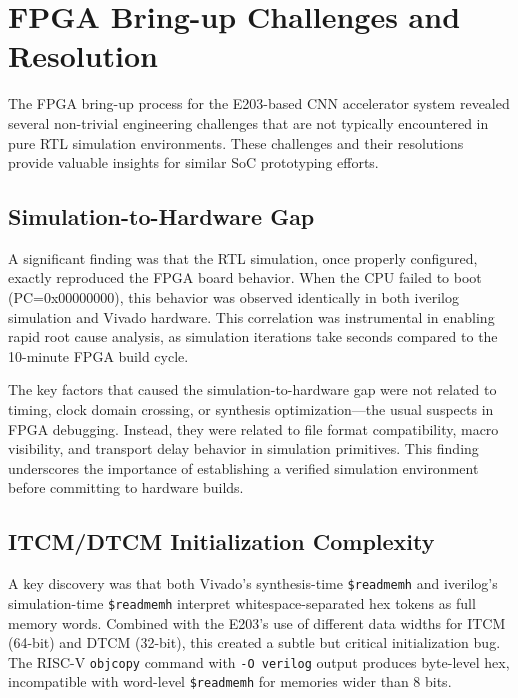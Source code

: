 

\section{FPGA Bring-up Challenges and Resolution}\label{sec:5_1}

The FPGA bring-up process for the E203-based CNN accelerator system revealed several non-trivial engineering challenges that are not typically encountered in pure RTL simulation environments. These challenges and their resolutions provide valuable insights for similar SoC prototyping efforts.


\subsection{Simulation-to-Hardware Gap}

A significant finding was that the RTL simulation, once properly configured, exactly reproduced the FPGA board behavior. When the CPU failed to boot (PC=0x00000000), this behavior was observed identically in both iverilog simulation and Vivado hardware. This correlation was instrumental in enabling rapid root cause analysis, as simulation iterations take seconds compared to the 10-minute FPGA build cycle.


The key factors that caused the simulation-to-hardware gap were not related to timing, clock domain crossing, or synthesis optimization---the usual suspects in FPGA debugging. Instead, they were related to file format compatibility, macro visibility, and transport delay behavior in simulation primitives. This finding underscores the importance of establishing a verified simulation environment before committing to hardware builds.


\subsection{ITCM/DTCM Initialization Complexity}

A key discovery was that both Vivado's synthesis-time \texttt{\$readmemh} and iverilog's simulation-time \texttt{\$readmemh} interpret whitespace-separated hex tokens as full memory words. Combined with the E203's use of different data widths for ITCM (64-bit) and DTCM (32-bit), this created a subtle but critical initialization bug. The RISC-V \texttt{objcopy} command with \mbox{\texttt{-O verilog}} output produces byte-level hex, incompatible with word-level \texttt{\$readmemh} for memories wider than 8 bits.


